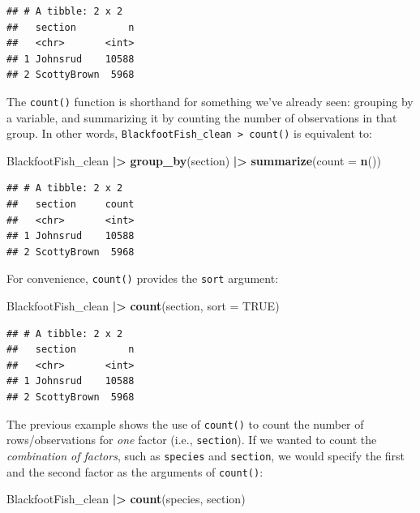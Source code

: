 \documentclass[
  10pt,
  letterpaper,
  twoside,
  openright]{book}
\newenvironment{Shaded}{\begin{snugshade}}{\end{snugshade}}
\newcommand{\AttributeTok}[1]{\textcolor[rgb]{0.13,0.29,0.53}{#1}}
\newcommand{\ConstantTok}[1]{\textcolor[rgb]{0.56,0.35,0.01}{#1}}
\newcommand{\FunctionTok}[1]{\textcolor[rgb]{0.13,0.29,0.53}{\textbf{#1}}}
\newcommand{\NormalTok}[1]{#1}
\newcommand{\SpecialCharTok}[1]{\textcolor[rgb]{0.81,0.36,0.00}{\textbf{#1}}}
\begin{document}
\begin{verbatim}
## # A tibble: 2 x 2
##   section         n
##   <chr>       <int>
## 1 Johnsrud    10588
## 2 ScottyBrown  5968
\end{verbatim}

The \texttt{count()} function is shorthand for something we've already
seen: grouping by a variable, and summarizing it by counting the number
of observations in that group. In other words,
\texttt{BlackfootFish\_clean\ \textbar{}\textgreater{}\ count()} is
equivalent to:

\begin{Shaded}
\begin{Highlighting}[]
\NormalTok{BlackfootFish\_clean }\SpecialCharTok{|\textgreater{}}
    \FunctionTok{group\_by}\NormalTok{(section) }\SpecialCharTok{|\textgreater{}}
    \FunctionTok{summarize}\NormalTok{(}\AttributeTok{count =} \FunctionTok{n}\NormalTok{())}
\end{Highlighting}
\end{Shaded}

\begin{verbatim}
## # A tibble: 2 x 2
##   section     count
##   <chr>       <int>
## 1 Johnsrud    10588
## 2 ScottyBrown  5968
\end{verbatim}

For convenience, \texttt{count()} provides the \texttt{sort} argument:

\begin{Shaded}
\begin{Highlighting}[]
\NormalTok{BlackfootFish\_clean }\SpecialCharTok{|\textgreater{}}
    \FunctionTok{count}\NormalTok{(section, }\AttributeTok{sort =} \ConstantTok{TRUE}\NormalTok{) }
\end{Highlighting}
\end{Shaded}

\begin{verbatim}
## # A tibble: 2 x 2
##   section         n
##   <chr>       <int>
## 1 Johnsrud    10588
## 2 ScottyBrown  5968
\end{verbatim}

The previous example shows the use of \texttt{count()} to count the
number of rows/observations for \emph{one} factor (i.e.,
\texttt{section}). If we wanted to count the \emph{combination of
factors}, such as \texttt{species} and \texttt{section}, we would
specify the first and the second factor as the arguments of
\texttt{count()}:

\begin{Shaded}
\begin{Highlighting}[]
\NormalTok{BlackfootFish\_clean }\SpecialCharTok{|\textgreater{}}
    \FunctionTok{count}\NormalTok{(species, section) }
\end{Highlighting}
\end{Shaded}
\end{document}
